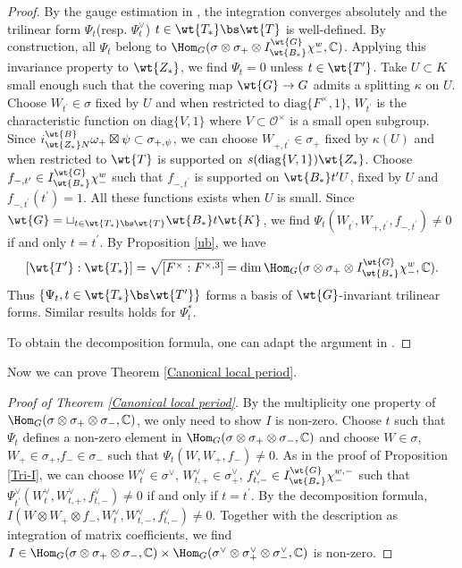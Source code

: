 \documentclass[11pt,reqno]{amsart}
\newcommand{\BC}{{\mathbb {C}}} \newcommand{\BD}{{\mathbb {D}}}
\newcommand{\CO}{{\mathcal {O}}} \newcommand{\CP}{{\mathcal {P}}}
\newcommand{\diag}{{\mathrm{diag}}}
\theoremstyle{plain}
\theoremstyle{remark} \newtheorem{remark}[thm]{Remark}
\theoremstyle{definition} \newtheorem{exercise}[thm]{Exercise}
\theoremstyle{definition} \newtheorem{example}[thm]{Example} \newtheorem{condition}[thm]{Condition}
\numberwithin{equation}{section}
\renewcommand{\-}{\text{--}}
\begin{document}
\begin{proof}By the gauge estimation in \cite[Theorem I.4.1]{KP84}, the integration converges absolutely and the trilinear form $\Psi_t$(resp. $\Psi_t^\vee$) $t\in \wt{T_*}\bs \wt{T}$ is well-defined. By construction, all $\Psi_t$ belong to $\Hom_G(\sigma\otimes\sigma_+\otimes I_{\wt{B_*}}^{\wt{G}}\chi_-^w,\BC)$. Applying this invariance property to $\wt{Z_*}$, we find $\Psi_t=0$ unless $t\in \wt{T^\prime}$. Take $U\subset K$ small enough such that the covering map $\wt{G}\to G$ admits a splitting $\kappa$ on $U$. Choose $W_{t^\prime}\in \sigma$ fixed by $U$ and when restricted to $\diag\{F^\times,1\}$, $W_{t^\prime}$ is the characteristic function on $\diag\{V,1\}$ where $V\subset \CO^\times$ is a small open subgroup. Since $i_{\wt{Z_*}N}^{\wt{B}}\omega_+\boxtimes\psi\subset \sigma_{+,\psi}$, we can choose $W_{+,t^\prime}\in\sigma_+$ fixed by $\kappa(U)$ and when restricted to $\wt{T}$ is supported on $s(\diag\{V,1\})\wt{Z_*}$. Choose $f_{-,t^\prime}\in I_{\wt{B_*}}^{\wt{G}}\chi_-^w$ such that $f_{-,t^\prime}$ is supported on $\wt{B_*}t^\prime U$, fixed by $U$ and $f_{-,t^\prime}(t^\prime)=1$. All these functions exists when $U$ is small. 
Since $\wt{G}=\sqcup_{t\in \wt{T_*}\bs \wt{T}} \wt{B_*} t \wt{K}$, we find $\Psi_t(W_{t^\prime},W_{+,t^\prime},f_{-,t^\prime})\neq0$ if and only $t=t^\prime$. By Proposition \ref{ub}, we have \[[\wt{T^\prime}:\wt{T_*}]=\sqrt{[F^\times:F^{\times,3}]}=\dim \Hom_G(\sigma\otimes\sigma_+\otimes I_{\wt{B_*}}^{\wt{G}}\chi_-^w,\BC).\]
Thus $\{\Psi_{t}, t\in \wt{T_*}\bs \wt{T^\prime}\}$ forms a 
basis of $\wt{G}$-invariant trilinear forms. Similar results holds for $\Psi_t^*$.

 To obtain the decomposition formula, one can  adapt the argument in  \cite[Proposition 5.2]{Hsi21}.
\end{proof}
Now we can prove Theorem \ref{Canonical local period}.
\begin{proof}[Proof of Theorem \ref{Canonical local period}] By the multiplicity one property of $\Hom_G(\sigma\otimes\sigma_+\otimes\sigma_-,\BC)$, we only need to show $I$ is non-zero. Choose $t$ such that $\Psi_t$ defines a non-zero element in $\Hom_G(\sigma\otimes\sigma_+\otimes\sigma_-,\BC)$ and choose $W\in\sigma$, $W_+\in\sigma_+$,$f_-\in\sigma_-$ such that $\Psi_t(W,W_+,f_-)\neq0$. As in the proof of Proposition \ref{Tri-I}, we can choose $W^\vee_t\in\sigma^\vee$, $W_{t,+}^\vee\in\sigma_+^\vee$, $f_{t,-}^\vee\in I_{\wt{B_*}}^{\wt{G}}\chi_-^{w,-}$ such that $\Psi_{t^\prime}^\vee(W^\vee_t,W_{t,+}^\vee,f_{t,-}^\vee)\neq0$ if and only if $t=t^\prime$. By the decomposition formula, 
$I(W\otimes W_+\otimes f_-,W^\vee_t,W_{t,-}^\vee,f_{t,-}^\vee)\neq0$. Together with the description as integration of matrix coefficients, we find $I\in  \Hom_{G}(\sigma\otimes\sigma_+\otimes\sigma_-,\BC)\times \Hom_{G}(\sigma^\vee\otimes\sigma_+^\vee\otimes\sigma_-^\vee,\BC)$ is non-zero.
\end{proof}
\end{document}

